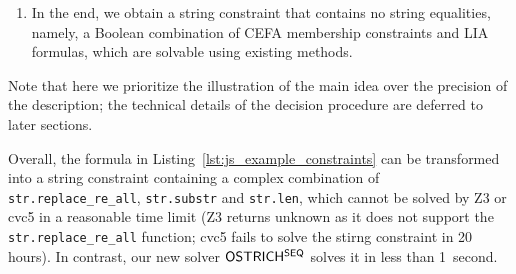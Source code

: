 {\begin{enumerate}[topsep=0pt,partopsep=0pt]
    
    \item In the end, we obtain a string constraint that contains no string equalities, namely, a Boolean combination of CEFA membership constraints and LIA formulas, which are solvable using existing methods.   
\end{enumerate}
Note that here we prioritize the illustration of the main idea over the precision of the description;  
the technical details of the decision procedure are deferred to later sections. %
}


Overall, the formula in Listing~\ref{lst:js_example_constraints} can be transformed into a string constraint containing a complex combination of {\tt str.replace\_re\_all}, {\tt str.substr} and {\tt str.len}, which cannot be solved by Z3 or cvc5 in a reasonable time limit (Z3 returns unknown as it does not support the {\tt str.replace\_re\_all} function; cvc5 fails to solve the stirng constraint in 20 hours).
In contrast, our new solver ${\sf OSTRICH^{SEQ}}$ solves it in less than 1~second. 
 


